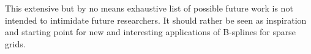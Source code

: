   
  

This extensive but by no means exhaustive list of possible future work is not
intended to intimidate future researchers.
It should rather be seen as inspiration and starting point
for new and interesting applications of B-splines for sparse grids.


\cleardoublepage
